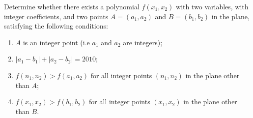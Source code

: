 Determine whether there exists a polynomial $f(x_1, x_2)$ with two variables, with integer coefficients, and two points $A=(a_1, a_2)$ and $B=(b_1, b_2)$ in the plane, satisfying the following conditions:
\begin{enumerate}[label=(\roman*)]
	\item $A$ is an integer point (i.e $a_1$ and $a_2$ are integers);
	\item $|a_1-b_1|+|a_2-b_2|=2010$;
	\item $f(n_1, n_2)>f(a_1, a_2)$ for all integer points $(n_1, n_2)$ in the plane other than $A$;
	\item $f(x_1, x_2)>f(b_1, b_2)$ for all integer points $(x_1, x_2)$ in the plane other than $B$.
\end{enumerate}